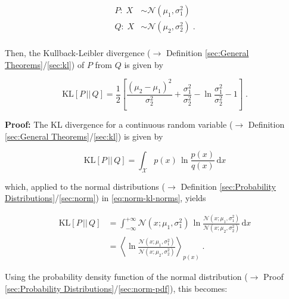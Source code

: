 \documentclass[a4paper,12pt,twoside]{book}
\begin{document}
\begin{equation} \label{eq:norm-kl-norms}
\begin{split}
P: \; X &\sim \mathcal{N}(\mu_1, \sigma_1^2) \\
Q: \; X &\sim \mathcal{N}(\mu_2, \sigma_2^2) \; . \\
\end{split}
\end{equation}

Then, the Kullback-Leibler divergence ($\rightarrow$ Definition \ref{sec:General Theorems}/\ref{sec:kl}) of $P$ from $Q$ is given by

\begin{equation} \label{eq:norm-kl-norm-KL}
\mathrm{KL}[P\,||\,Q] = \frac{1}{2} \left[ \frac{(\mu_2 - \mu_1)^2}{\sigma_2^2} + \frac{\sigma_1^2}{\sigma_2^2} - \ln \frac{\sigma_1^2}{\sigma_2^2} - 1 \right] \; .
\end{equation}


\vspace{1em}
\textbf{Proof:} The KL divergence for a continuous random variable ($\rightarrow$ Definition \ref{sec:General Theorems}/\ref{sec:kl}) is given by 

\begin{equation} \label{eq:norm-kl-KL-cont}
\mathrm{KL}[P\,||\,Q] = \int_{\mathcal{X}} p(x) \, \ln \frac{p(x)}{q(x)} \, \mathrm{d}x
\end{equation}

which, applied to the normal distributions ($\rightarrow$ Definition \ref{sec:Probability Distributions}/\ref{sec:norm}) in \eqref{eq:norm-kl-norms}, yields

\begin{equation} \label{eq:norm-kl-norm-KL-s1}
\begin{split}
\mathrm{KL}[P\,||\,Q] &= \int_{-\infty}^{+\infty} \mathcal{N}(x; \mu_1, \sigma_1^2) \, \ln \frac{\mathcal{N}(x; \mu_1, \sigma_1^2)}{\mathcal{N}(x; \mu_2, \sigma_2^2)} \, \mathrm{d}x \\
&= \left\langle \ln \frac{\mathcal{N}(x; \mu_1, \sigma_1^2)}{\mathcal{N}(x; \mu_2, \sigma_2^2)} \right\rangle_{p(x)} \; .
\end{split}
\end{equation}

Using the probability density function of the normal distribution ($\rightarrow$ Proof \ref{sec:Probability Distributions}/\ref{sec:norm-pdf}), this becomes:
\end{document}
